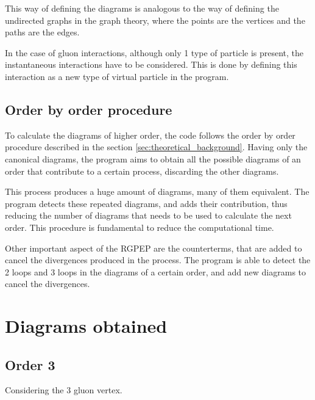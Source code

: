\documentclass[11pt,a4paper,twoside,pdf]{article}
\numberwithin{equation}{section}
\begin{document}
This way of defining the diagrams is analogous to the way of defining the undirected 
graphs in the graph theory, where the points are the vertices and the paths are the 
edges. 

In the case of gluon interactions, although only 1 type of particle is present, the
instantaneous interactions have to be considered. This is done by defining this 
interaction as a new type of virtual particle in the program.


\subsection{Order by order procedure}

To calculate the diagrams of higher order, the code follows the order by order 
procedure described in the section \ref{sec:theoretical_background}. Having only the
canonical diagrams, the program aims to obtain all the possible diagrams of an order
that contribute to a certain process, discarding the other diagrams.

This process produces a huge amount of diagrams, many of them equivalent. The 
program detects these repeated diagrams, and adds their contribution, thus reducing 
the number of diagrams that needs to be used to calculate the next order. This procedure
is fundamental to reduce the computational time.

Other important aspect of the RGPEP are the counterterms, that are added to cancel 
the divergences produced in the process. The program is able to detect the 2 loops
and 3 loops in the diagrams of a certain order, and add new diagrams to cancel the 
divergences. 




\section{Diagrams obtained} \label{sec:diagrams}


\subsection{Order 3}

Considering the 3 gluon vertex.
\end{document}
